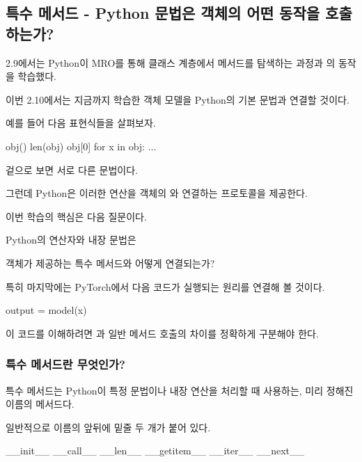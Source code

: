 

\subsection{특수 메서드 - Python 문법은 객체의 어떤 동작을 호출하는가?}

2.9에서는 Python이 MRO를 통해 클래스 계층에서 메서드를 탐색하는 과정과 의 동작을 학습했다.

이번 2.10에서는 지금까지 학습한 객체 모델을 Python의 기본 문법과 연결할 것이다.

예를 들어 다음 표현식들을 살펴보자.

\begin{dhkcode}
obj()
len(obj)
obj[0]
for x in obj:
    ...
\end{dhkcode}

겉으로 보면 서로 다른 문법이다.

그런데 Python은 이러한 연산을 객체의 와 연결하는 프로토콜을 제공한다.

이번 학습의 핵심은 다음 질문이다.

\begin{dhksmry}[centered]
Python의 연산자와 내장 문법은

객체가 제공하는 특수 메서드와 어떻게 연결되는가?
\end{dhksmry}

특히 마지막에는 PyTorch에서 다음 코드가 실행되는 원리를 연결해 볼 것이다.

\begin{dhkcode}
output = model(x)
\end{dhkcode}

이 코드를 이해하려면 과 일반 메서드 호출의 차이를 정확하게 구분해야 한다.

\subsubsection{특수 메서드란 무엇인가?}

특수 메서드는 Python이 특정 문법이나 내장 연산을 처리할 때 사용하는, 미리 정해진 이름의 메서드다.

일반적으로 이름의 앞뒤에 밑줄 두 개가 붙어 있다.

\begin{dhkcode}
__init__
__call__
__len__
__getitem__
__iter__
__next__
\end{dhkcode}

